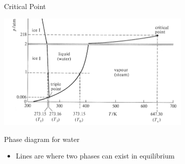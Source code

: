 \documentclass[xcolor=dvipsnames]{beamer}
\begin{document}
\subsection{} %

\begin{frame}{Critical Point}
  \begin{center}
    \includegraphics[width=0.7\textwidth]{figs/phase-diagram-zoom}

    Phase diagram for water
  \end{center}

  \begin{itemize}
    \item Lines are where two phases can exist in equilibrium
  \end{itemize}

\end{frame}
\end{document}
